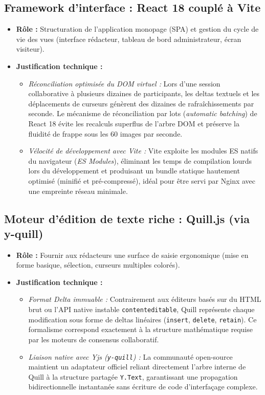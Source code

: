 \subsection{Framework d'interface : React 18 couplé à Vite}
\begin{itemize}
    \item \textbf{Rôle :} Structuration de l'application monopage (SPA) et gestion du cycle de vie des vues (interface rédacteur, tableau de bord administrateur, écran visiteur).
    \item \textbf{Justification technique :} 
    \begin{itemize}
        \item \emph{Réconciliation optimisée du DOM virtuel :} Lors d'une session collaborative à plusieurs dizaines de participants, les deltas textuels et les déplacements de curseurs génèrent des dizaines de rafraîchissements par seconde. Le mécanisme de réconciliation par lots (\emph{automatic batching}) de React 18 évite les recalculs superflus de l'arbre DOM et préserve la fluidité de frappe sous les 60 images par seconde.
        \item \emph{Vélocité de développement avec Vite :} Vite exploite les modules ES natifs du navigateur (\emph{ES Modules}), éliminant les temps de compilation lourds lors du développement et produisant un bundle statique hautement optimisé (minifié et pré-compressé), idéal pour être servi par Nginx avec une empreinte réseau minimale.
    \end{itemize}
\end{itemize}

\subsection{Moteur d'édition de texte riche : Quill.js (via y-quill)}
\begin{itemize}
    \item \textbf{Rôle :} Fournir aux rédacteurs une surface de saisie ergonomique (mise en forme basique, sélection, curseurs multiples colorés).
    \item \textbf{Justification technique :} 
    \begin{itemize}
        \item \emph{Format Delta immuable :} Contrairement aux éditeurs basés sur du HTML brut ou l'API native instable \texttt{contenteditable}, Quill représente chaque modification sous forme de deltas linéaires (\texttt{insert}, \texttt{delete}, \texttt{retain}). Ce formalisme correspond exactement à la structure mathématique requise par les moteurs de consensus collaboratif.
        \item \emph{Liaison native avec Yjs (\texttt{y-quill}) :} La communauté open-source maintient un adaptateur officiel reliant directement l'arbre interne de Quill à la structure partagée \texttt{Y.Text}, garantissant une propagation bidirectionnelle instantanée sans écriture de code d'interfaçage complexe.
    \end{itemize}
\end{itemize}

